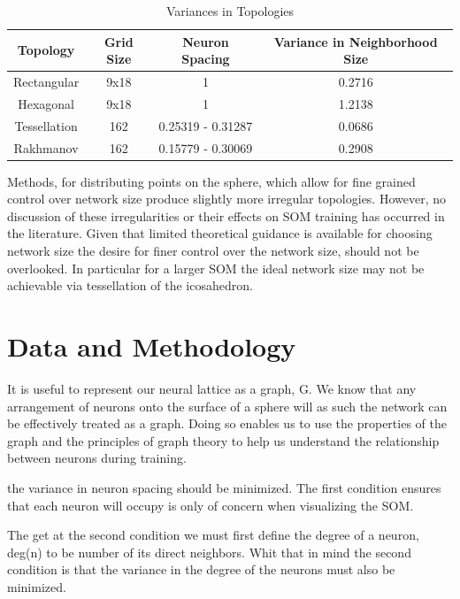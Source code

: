 \documentclass[11pt]{article}
\begin{document}
\begin{table}[htbp]
\caption{Variances in Topologies}
\begin{center}
\begin{tabular}{|c|c|c|c|}
\hline
Topology&Grid Size&Neuron Spacing&Variance in Neighborhood Size\\
\hline
Rectangular&9x18&1&0.2716\\
Hexagonal&9x18&1&1.2138\\
Tessellation&162&0.25319 - 0.31287& 0.0686\\
Rakhmanov&162&0.15779 - 0.30069& 0.2908\\
\hline
\end{tabular}
\end{center}
\label{table1}
\end{table}

Methods, for distributing points on the sphere, which allow for fine grained
control over network size produce slightly more irregular topologies.  However,
no discussion of these irregularities or their effects on SOM training has
occurred in the literature. Given that limited theoretical guidance is available
for choosing network size the desire for finer control over the network size,
should not be overlooked. In particular for a larger SOM the ideal network size
may not be achievable via tessellation of the icosahedron.

\section{Data and Methodology}
It is useful to represent our neural lattice as a graph, G.
We know that any arrangement of neurons onto the surface of a sphere will 
 as such the network can be effectively treated as a graph.  Doing so enables us to use the properties of the graph and the principles of graph theory to help us understand the relationship between neurons during training.





the variance in neuron spacing should be minimized.    The first condition ensures that each neuron will occupy is only of concern when visualizing the SOM.



The get at the second condition we must first define the degree of a neuron, deg(n) to be number of its direct neighbors.  Whit that in mind the second condition is that the variance in the degree of the neurons must also be minimized.
\end{document}
